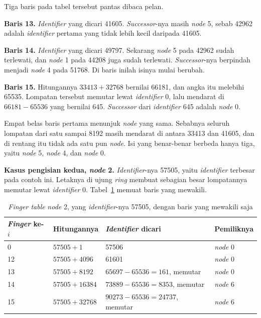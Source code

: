 Tiga baris pada tabel tersebut pantas dibaca pelan.

\textbf{Baris 13.} \textit{Identifier} yang dicari 41605. \textit{Successor}-nya masih \textit{node} 5,
sebab 42962 adalah \textit{identifier} pertama yang tidak lebih kecil daripada 41605.

\textbf{Baris 14.} \textit{Identifier} yang dicari 49797. Sekarang \textit{node} 5 pada 42962
sudah terlewati, dan \textit{node} 1 pada 44208 juga sudah terlewati. \textit{Successor}-nya
berpindah menjadi \textit{node} 4 pada 51768. Di baris inilah isinya mulai
berubah.

\textbf{Baris 15.} Hitungannya $33413 + 32768$ bernilai 66181, dan angka itu
melebihi 65535. Lompatan tersebut memutar lewat \textit{identifier} 0, lalu mendarat di
$66181 - 65536$ yang bernilai 645. \textit{Successor} dari \textit{identifier} 645 adalah \textit{node} 0.

Empat belas baris pertama menunjuk \textit{node} yang sama. Sebabnya seluruh
lompatan dari satu sampai 8192 masih mendarat di antara 33413 dan 41605, dan di
rentang itu tidak ada satu pun \textit{node}. Isi yang benar-benar berbeda hanya
tiga, yaitu \textit{node} 5, \textit{node} 4, dan \textit{node} 0.

\textbf{Kasus pengisian kedua, \textit{node} 2.} \textit{Identifier}-nya 57505, yaitu \textit{identifier}
terbesar pada contoh ini. Letaknya di ujung \textit{ring} membuat sebagian besar
lompatannya memutar lewat \textit{identifier} 0. Tabel~\ref{tab:jari-node2} memuat baris
yang mewakili.

\begin{table}[htbp]
  \centering
  \caption{\textit{Finger table} \textit{node} 2, yang \textit{identifier}-nya 57505, dengan
    baris yang mewakili saja}
  \label{tab:jari-node2}
  \begin{tabularx}{\textwidth}{|l|l|X|l|}
    \hline
    \textbf{\textit{Finger} ke-$i$} & \textbf{Hitungannya} & \textbf{\textit{Identifier} dicari} & \textbf{Pemiliknya} \\
    \hline
    0 & $57505 + 1$ & 57506 & \textit{node} 0 \\
    \hline
    12 & $57505 + 4096$ & 61601 & \textit{node} 0 \\
    \hline
    13 & $57505 + 8192$ & $65697 - 65536 = 161$, memutar & \textit{node} 0 \\
    \hline
    14 & $57505 + 16384$ & $73889 - 65536 = 8353$, memutar & \textit{node} 6 \\
    \hline
    15 & $57505 + 32768$ & $90273 - 65536 = 24737$, memutar & \textit{node} 6 \\
    \hline
  \end{tabularx}
\end{table}


